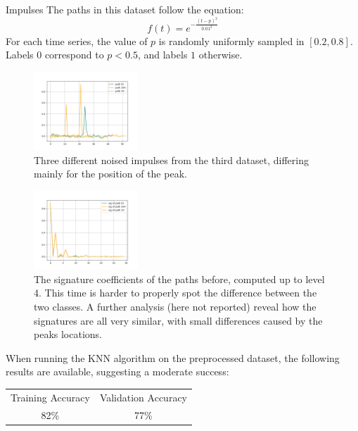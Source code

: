 \documentclass[twocolumn,9pt]{article}
\theoremstyle{definition}
\theoremstyle{remark}
\begin{document}
\begin{section}{Impulses}
The paths in this dataset follow the equation:
\begin{equation}
f(t) = e^{ - \frac{(t - p)^2}{0.01^2}}
\end{equation}
For each time series,
the value of $p$ is randomly uniformly sampled in $[0.2, 0.8]$.
Labels $0$ correspond to $p < 0.5$, and labels $1$ otherwise.

\begin{figure}[H]
\center
\includegraphics[width=0.35\textwidth]{proposed_plots/IMP-paths-seed0.png}
\caption{
Three different noised impulses from the third dataset,
differing mainly for the position of the peak.
}
\end{figure}

\begin{figure}[H]
\center
\includegraphics[width=0.35\textwidth]{proposed_plots/IMP-signatures-seed0.png}
\caption{
The signature coefficients of the paths before,
computed up to level 4.
This time is harder to properly spot the difference between the two classes.
A further analysis (here not reported) reveal how the
signatures are all very similar, with small differences
caused by the peaks locations.
}
\end{figure}

When running the KNN algorithm on the preprocessed dataset, the following
results are available, suggesting a moderate success:

\begin{tabular}{ |c|c| }
\hline
Training Accuracy & Validation Accuracy \\
82\%	& 77\%	\\
\hline
\end{tabular}


\end{section}
\end{document}
